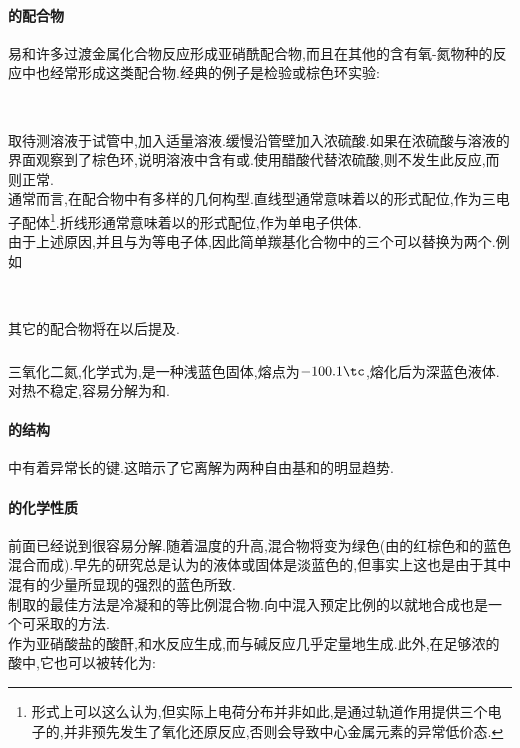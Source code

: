 \documentclass{ctexbook}
\begin{document}
\paragraph{的配合物}
易和许多过渡金属化合物反应形成亚硝酰配合物,而且在其他的含有氧-氮物种的反应中也经常形成这类配合物.经典的例子是检验或棕色环实验:
\begin{center}
    \\
\end{center}
取待测溶液于试管中,加入适量溶液.缓慢沿管壁加入浓硫酸.如果在浓硫酸与溶液的界面观察到了棕色环,说明溶液中含有或.使用醋酸代替浓硫酸,则不发生此反应,而则正常.\\
\indent 通常而言,在配合物中有多样的几何构型.直线型通常意味着以的形式配位,作为三电子配体\footnote{形式上可以这么认为,但实际上电荷分布并非如此,是通过轨道作用提供三个电子的,并非预先发生了氧化还原反应,否则会导致中心金属元素的异常低价态.}.折线形通常意味着以的形式配位,作为单电子供体.\\
\indent 由于上述原因,并且与为等电子体,因此简单羰基化合物中的三个可以替换为两个.例如
\begin{center}
    \\
\end{center}
其它的配合物将在以后提及.
\subsubsection{}
\begin{substance}[\ce{N2O3}]
    三氧化二氮,化学式为,是一种浅蓝色固体,熔点为$-100.1\tc$,熔化后为深蓝色液体.对热不稳定,容易分解为和.
\end{substance}
\paragraph{的结构}
中有着异常长的键.这暗示了它离解为两种自由基和的明显趋势.
\paragraph{的化学性质}
前面已经说到很容易分解.随着温度的升高,混合物将变为绿色(由的红棕色和的蓝色混合而成).早先的研究总是认为的液体或固体是淡蓝色的,但事实上这也是由于其中混有的少量所显现的强烈的蓝色所致.\\
\indent 制取的最佳方法是冷凝和的等比例混合物.向中混入预定比例的以就地合成也是一个可采取的方法.\\
\indent 作为亚硝酸盐的酸酐,和水反应生成,而与碱反应几乎定量地生成.此外,在足够浓的酸中,它也可以被转化为:
\begin{center}
\end{center}
\end{document}
